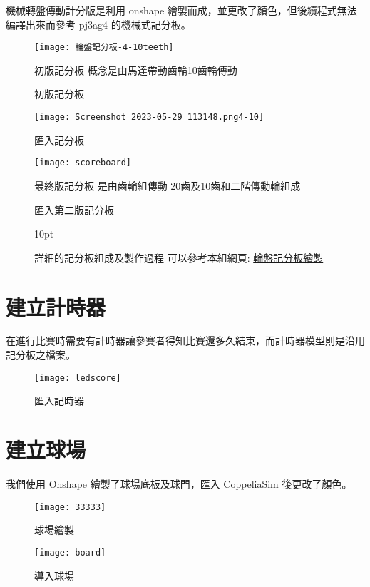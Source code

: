 機械轉盤傳動計分版是利用 onshape 繪製而成，並更改了顏色，但後續程式無法編譯出來而參考 pj3ag4 的機械式記分板。\\
\begin{figure}[hbt!]
\begin{center}
\texttt{[image: 輪盤記分板-4-10teeth]}
\caption{\Large 初版記分板}\label{初版記分板}
初版記分板 概念是由馬達帶動齒輪10齒輪傳動
\end{center}
\end{figure}
\begin{figure}[hbt!]
\begin{center}
\texttt{[image: Screenshot 2023-05-29 113148.png4-10]}
\caption{\Large 匯入記分板}\label{匯入記分板}
\end{center}
\end{figure}
\begin{figure}[hbt!]
\begin{center}
\texttt{[image: scoreboard]}
\caption{\Large 匯入第二版記分板}\label{匯入最終版記分板}
最終版記分板 是由齒輪組傳動 20齒及10齒和二階傳動輪組成
\end{center}
\end{figure}

\begin{figure}{10pt}
\begin{center}
詳細的記分板組成及製作過程 可以參考本組網頁:
\href{https://mdecd2023.github.io/2a3-pj3ag1/content/輪盤記分板繪製.html}{輪盤記分板繪製}
\end{center}
\end{figure}

\section{建立計時器}
在進行比賽時需要有計時器讓參賽者得知比賽還多久結束，而計時器模型則是沿用記分板之檔案。\\
\begin{figure}[hbt!]
\begin{center}
\texttt{[image: ledscore]}
\caption{\Large 匯入記時器}\label{匯入記時器}
\end{center}
\end{figure}

\section{建立球場}
我們使用 Onshape 繪製了球場底板及球門，匯入 CoppeliaSim 後更改了顏色。\\
\begin{figure}[hbt!]
\begin{center}
\texttt{[image: 33333]}
\caption{\Large 球場繪製}\label{球場繪製}
\end{center}
\end{figure}
\begin{figure}[hbt!]
\begin{center}
\texttt{[image: board]}
\caption{\Large 導入球場}\label{導入球場}
\end{center}
\end{figure}
\newpage

\renewcommand{\baselinestretch}{0.5} %